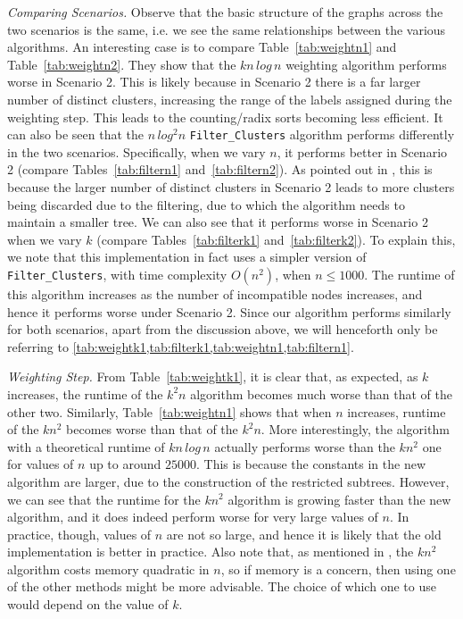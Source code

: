 \documentclass[final,1p,times]{elsarticle}
\begin{document}
    \textit{Comparing Scenarios.} Observe that the basic structure of the graphs across the two scenarios is the same, i.e. we see the same relationships between the various algorithms. An interesting case is to compare Table~\ref{tab:weightn1} and Table~\ref{tab:weightn2}. They show that the $kn\,log\,n$ weighting algorithm performs worse in Scenario 2. This is likely because in Scenario 2 there is a far larger number of distinct clusters, increasing the range of the labels assigned during the weighting step. This leads to the counting/radix sorts becoming less efficient. It can also be seen that the $n\,log^2n$ \texttt{Filter\_Clusters} algorithm performs differently in the two scenarios. Specifically, when we vary $n$, it performs better in Scenario 2 (compare Tables~\ref{tab:filtern1} and~\ref{tab:filtern2}). As pointed out in \cite{jansson2018algorithms}, this is because the larger number of distinct clusters in Scenario 2 leads to more clusters being discarded due to the filtering, due to which the algorithm needs to maintain a smaller tree. We can also see that it performs worse in Scenario 2 when we vary $k$ (compare Tables~\ref{tab:filterk1} and~\ref{tab:filterk2}). To explain this, we note that this implementation in fact uses a simpler version of \texttt{Filter\_Clusters}, with time complexity $O(n^2)$, when $n \leq 1000$. The runtime of this algorithm increases as the number of incompatible nodes increases, and hence it performs worse under Scenario 2. Since our algorithm performs similarly for both scenarios, apart from the discussion above, we will henceforth only be referring to \cref{tab:weightk1,tab:filterk1,tab:weightn1,tab:filtern1}.

    \textit{Weighting Step.} From Table~\ref{tab:weightk1}, it is clear that, as expected, as $k$ increases, the runtime of the $k^2n$ algorithm becomes much worse than that of the other two. Similarly, Table~\ref{tab:weightn1} shows that when $n$ increases, runtime of the $kn^2$ becomes worse than that of the $k^2n$. More interestingly, the algorithm with a theoretical runtime of $kn\,log\,n$ actually performs worse than the $kn^2$ one for values of $n$ up to around $25000$. This is because the constants in the new algorithm are larger, due to the construction of the restricted subtrees. However, we can see that the runtime for the $kn^2$ algorithm is growing faster than the new algorithm, and it does indeed perform worse for very large values of $n$. In practice, though, values of $n$ are not so large, and hence it is likely that the old implementation is better in practice. Also note that, as mentioned in \cite{jansson2018algorithms}, the $kn^2$ algorithm costs memory quadratic in $n$, so if memory is a concern, then using one of the other methods might be more advisable. The choice of which one to use would depend on the value of $k$.
\end{document}

